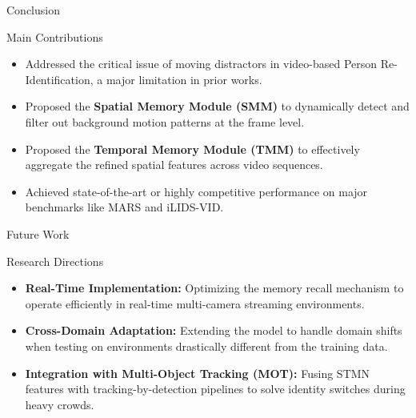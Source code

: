 \begin{frame}{Conclusion}
    \small
    \begin{block}{Main Contributions}
        \begin{itemize}\setlength\itemsep{4pt}
            \item Addressed the critical issue of moving distractors in video-based Person Re-Identification, a major limitation in prior works.
            \item Proposed the \textbf{Spatial Memory Module (SMM)} to dynamically detect and filter out background motion patterns at the frame level.
            \item Proposed the \textbf{Temporal Memory Module (TMM)} to effectively aggregate the refined spatial features across video sequences.
            \item Achieved state-of-the-art or highly competitive performance on major benchmarks like MARS and iLIDS-VID.
        \end{itemize}
    \end{block}
\end{frame}

\begin{frame}{Future Work}
    \small
    \begin{block}{Research Directions}
        \begin{itemize}\setlength\itemsep{3pt}
            \item \textbf{Real-Time Implementation:} Optimizing the memory recall mechanism to operate efficiently in real-time multi-camera streaming environments.
            \item \textbf{Cross-Domain Adaptation:} Extending the model to handle domain shifts when testing on environments drastically different from the training data.
            \item \textbf{Integration with Multi-Object Tracking (MOT):} Fusing STMN features with tracking-by-detection pipelines to solve identity switches during heavy crowds.
        \end{itemize}
    \end{block}
\end{frame}